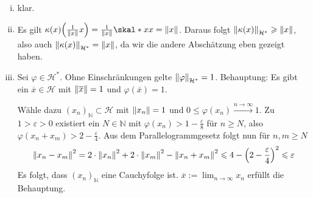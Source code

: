 \begin{enumerate}[(i)]
	\item klar.
	\item Es gilt $\kappa(x) \enbrace*{\frac{1}{\norm{x}}x }= \frac{1}{\norm{x}} \skal*{x}{x} = \norm{x}$. Daraus folgt $\norm[\mathcal{H}^*]{\kappa(x)} \ge \norm{x}$, also
	auch $\norm[\mathcal{H}^*]{\kappa(x)}= \norm{x}$, da wir die andere Abschätzung eben gezeigt haben.
	\item Sei $\varphi \in \mathcal{H}^*$. Ohne Einschränkungen gelte $\norm[\mathcal{H}^*]{\varphi}=1$. 
	Behauptung: Es gibt ein $\overline{x} \in \mathcal{H}$ mit $\norm{\overline{x}}=1 $ und
	$\varphi(\overline{x} )=1$. 
	
	Wähle dazu $(x_n)_\mathds{N} \subset \mathcal{H}$ mit $\norm{x_n}=1$ und $0\le \varphi(x_n) \xrightarrow{n \to \infty} 1$.
	Zu $1 >\varepsilon>0$ existiert ein $N \in \mathds{N}$ mit $\varphi(x_n) > 1- \frac{\varepsilon}{8} $ für $n \ge N$, also $\varphi(x_n +x_m) > 2- \frac{\varepsilon}{4}$.
	Aus dem Parallelogrammgesetz folgt nun für $n,m \ge N$
	\begin{align*}
		\norm{x_n -x_m}^2 = 2 \cdot \norm{x_n}^2 + 2 \cdot \norm{x_m}^2 - \norm{x_n +x_m}^2 \le 4 - \enbrace*{2-\frac{\varepsilon}{4} }^2 \le \varepsilon 
	\end{align*}
	Es folgt, dass $(x_n)_\mathds{N}$ eine Cauchyfolge ist. $\overline{x} := \lim_{ n \to \infty} x_n$ erfüllt die Behauptung.
	

\end{enumerate}
